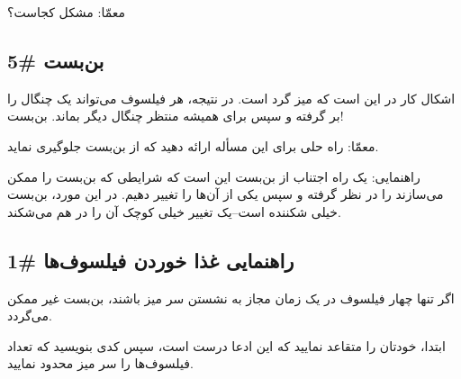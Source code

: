 \documentclass{book}
\newcommand{\clearemptydoublepage}{\newpage\cleardoublepage}
\begin{document}
    معمّا:‌ مشکل کجاست؟


\clearemptydoublepage
\subsection{بن‌بست \#5}

    اشکال کار در این است که میز گرد است. در نتیجه، هر فیلسوف می‌تواند یک چنگال را بر گرفته و سپس برای همیشه منتظر چنگال دیگر بماند. بن‌بست! 

    معمّا: راه حلی برای این مسأله ارائه دهید که از بن‌بست جلوگیری نماید. 

    راهنمایی: یک راه اجتناب از بن‌بست این است که شرایطی که بن‌بست را ممکن می‌سازند را در نظر گرفته  و سپس یکی از آن‌ها را تغییر دهیم. 
    در این مورد، بن‌بست خیلی شکننده است--یک تغییر خیلی کوچک آن را در هم می‌شکند. 

\clearemptydoublepage
\subsection{راهنمایی غذا خوردن فیلسوف‌ها \#1}

    اگر تنها چهار فیلسوف در یک زمان مجاز به نشستن سر میز باشند، بن‌بست غیر ممکن می‌گردد. 

    ابتدا، خودتان را متقاعد نمایید که این ادعا درست است، سپس کدی بنویسید که تعداد فیلسوف‌ها را سر میز محدود نمایید. 


\clearemptydoublepage
\end{document}
